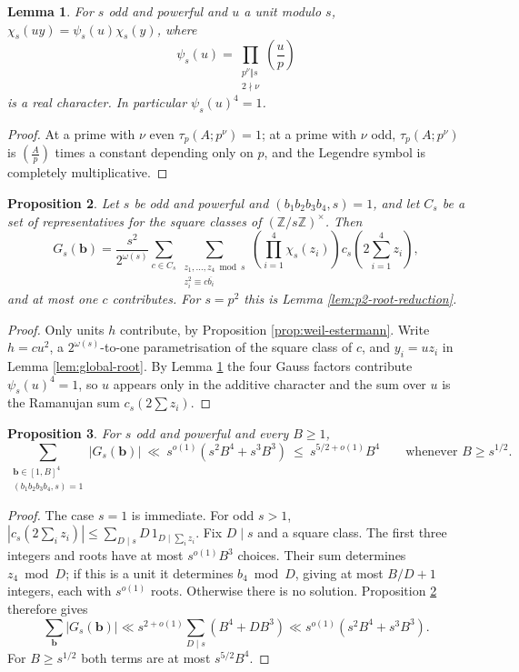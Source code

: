 \documentclass[12pt, a4paper]{amsart}
\numberwithin{equation}{section}
\newcommand{\Z}{\mathbb{Z}}
\renewcommand{\le}{\leqslant}
\renewcommand{\ge}{\geqslant}
\theoremstyle{plain}
\newtheorem{lem}{Lemma}[section]
\newtheorem{prop}[lem]{Proposition}
\begin{document}
\begin{lem}\label{lem:chi-cancel}
 For $s$ odd and powerful and $u$ a unit modulo $s$, $\chi_s(uy)=\psi_s(u)\chi_s(y)$, where
$$
\psi_s(u)=\prod_{\substack{p^{\nu}\Vert s\\ 2\nmid\nu}}\left(\frac up\right)
$$
is a real character. In particular $\psi_s(u)^4=1$.
\end{lem}

\begin{proof}
At a prime with $\nu$ even $\tau_p(A;p^\nu)=1$; at a prime with $\nu$ odd, $\tau_p(A;p^\nu)$ is $\left(\frac Ap\right)$ times a constant depending only on $p$, and the Legendre symbol is completely multiplicative.
\end{proof}

\begin{prop}\label{prop:general-root-reduction}
Let $s$ be odd and powerful and $(b_1b_2b_3b_4,s)=1$, and let $C_s$ be a set of representatives for the square classes of $(\Z/s\Z)^\times$. Then
$$
G_s(\mathbf b)=\frac{s^2}{2^{\omega(s)}}\sum_{c\in C_s}
\sum_{\substack{z_1,\ldots,z_4\bmod s\\ z_i^2\equiv c\overline{b_i}}}
\left(\prod_{i=1}^4\chi_s(z_i)\right)c_s\left(2\sum_{i=1}^4z_i\right),
$$
and at most one $c$ contributes. For $s=p^2$ this is Lemma \ref{lem:p2-root-reduction}.
\end{prop}

\begin{proof}
Only units $h$ contribute, by Proposition \ref{prop:weil-estermann}. Write $h=cu^2$, a $2^{\omega(s)}$-to-one parametrisation of the square class of $c$, and $y_i=uz_i$ in Lemma \ref{lem:global-root}. By Lemma \ref{lem:chi-cancel} the four Gauss factors contribute $\psi_s(u)^4=1$, so $u$ appears only in the additive character and the sum over $u$ is the Ramanujan sum $c_s(2\sum z_i)$.
\end{proof}

\begin{prop}\label{prop:general-fourth}
For $s$ odd and powerful and every $B\ge1$,
$$
\sum_{\substack{\mathbf b\in[1,B]^4\\(b_1b_2b_3b_4,s)=1}}|G_s(\mathbf b)|
\ \ll\ s^{o(1)}\left(s^2B^4+s^3B^3\right)
\ \le\ s^{5/2+o(1)}B^4
\qquad\text{whenever } B\ge s^{1/2}.
$$
\end{prop}

\begin{proof}
 The case $s=1$ is immediate. For odd $s>1$, $|c_s(2\sum_iz_i)|\le\sum_{D\mid s}D\,1_{D\mid\sum_iz_i}$. Fix $D\mid s$ and a square class. The first three integers and roots have at most $s^{o(1)}B^3$ choices. Their sum determines $z_4\bmod D$; if this is a unit it determines $b_4\bmod D$, giving at most $B/D+1$ integers, each with $s^{o(1)}$ roots. Otherwise there is no solution. Proposition \ref{prop:general-root-reduction} therefore gives
$$
\sum_{\mathbf b}|G_s(\mathbf b)|
\ll s^{2+o(1)}\sum_{D\mid s}(B^4+DB^3)
\ll s^{o(1)}(s^2B^4+s^3B^3).
$$
For $B\ge s^{1/2}$ both terms are at most $s^{5/2}B^4$.
\end{proof}
\end{document}
